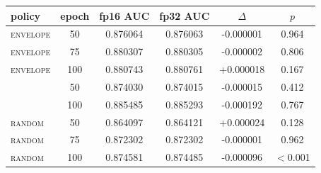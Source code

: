 \begin{tabular}{lccccc}
\toprule
policy & epoch & fp16 AUC & fp32 AUC & $\Delta$ & $p$ \\
\midrule
\textsc{envelope} & 50 & 0.876064 & 0.876063 & -0.000001 & 0.964 \\
\textsc{envelope} & 75 & 0.880307 & 0.880305 & -0.000002 & 0.806 \\
\textsc{envelope} & 100 & 0.880743 & 0.880761 & +0.000018 & 0.167 \\
\ArmBest{} & 50 & 0.874030 & 0.874015 & -0.000015 & 0.412 \\
\ArmBest{} & 100 & 0.885485 & 0.885293 & -0.000192 & 0.767 \\
\textsc{random} & 50 & 0.864097 & 0.864121 & +0.000024 & 0.128 \\
\textsc{random} & 75 & 0.872302 & 0.872302 & -0.000001 & 0.962 \\
\textsc{random} & 100 & 0.874581 & 0.874485 & -0.000096 & $<$0.001 \\
\bottomrule
\end{tabular}
